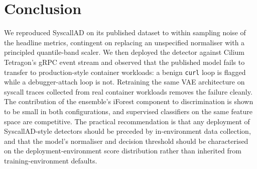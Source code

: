 \FloatBarrier
\section{Conclusion}
\label{sec:conclusion}

We reproduced SyscallAD on its published dataset to within
sampling noise of the headline metrics, contingent on replacing an
unspecified normaliser with a principled quantile-band scaler. We then
deployed the detector against Cilium Tetragon's gRPC event stream and
observed that the published model fails to transfer to production-style
container workloads: a benign \texttt{curl} loop is flagged while a
debugger-attach loop is not. Retraining the same VAE architecture on
syscall traces collected from real container workloads removes the
failure cleanly. The contribution of the ensemble's iForest
component to discrimination is shown to be small in both
configurations, and supervised classifiers on the same feature space
are competitive. The practical recommendation is that any deployment
of SyscallAD-style detectors should be preceded by in-environment
data collection, and that the model's normaliser and decision
threshold should be characterised on the deployment-environment
score distribution rather than inherited from training-environment
defaults.
